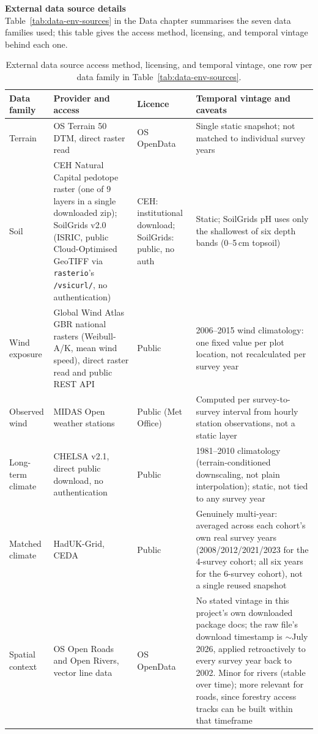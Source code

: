 \documentclass[logo,msc,ai]{infthesis}           %
\begin{document}
\begin{table}[H]
\centering
\textbf{External data source details}\label{app:data-sources}\\[4pt]
{\small Table~\ref{tab:data-env-sources} in the Data chapter summarises the seven data families used; this table gives the access method, licensing, and temporal vintage behind each one.\\[6pt]}
\scriptsize
\setlength{\tabcolsep}{3pt}
\renewcommand{\arraystretch}{1.1}
\begin{tabular}{p{1.8cm}p{4.7cm}p{2.0cm}p{5.2cm}}
\hline
Data family & Provider and access & Licence & Temporal vintage and caveats \\
\hline
Terrain & OS Terrain 50 DTM, direct raster read & OS OpenData & Single static snapshot; not matched to individual survey years \\
Soil & CEH Natural Capital pedotope raster (one of 9 layers in a single downloaded zip); SoilGrids v2.0 (ISRIC, public Cloud-Optimised GeoTIFF via \texttt{rasterio}'s \texttt{/vsicurl/}, no authentication) & CEH: institutional download; SoilGrids: public, no auth & Static; SoilGrids pH uses only the shallowest of six depth bands (0--5\,cm topsoil) \\
Wind exposure & Global Wind Atlas GBR national rasters (Weibull-A/K, mean wind speed), direct raster read and public REST API & Public & 2006--2015 wind climatology: one fixed value per plot location, not recalculated per survey year \\
Observed wind & MIDAS Open weather stations & Public (Met Office) & Computed per survey-to-survey interval from hourly station observations, not a static layer \\
Long-term climate & CHELSA v2.1, direct public download, no authentication & Public & 1981--2010 climatology (terrain-conditioned downscaling, not plain interpolation); static, not tied to any survey year \\
Matched climate & HadUK-Grid, CEDA & Public & Genuinely multi-year: averaged across each cohort's own real survey years (2008/2012/2021/2023 for the 4-survey cohort; all six years for the 6-survey cohort), not a single reused snapshot \\
Spatial context & OS Open Roads and Open Rivers, vector line data & OS OpenData & No stated vintage in this project's own downloaded package docs; the raw file's download timestamp is $\sim$July 2026, applied retroactively to every survey year back to 2002. Minor for rivers (stable over time); more relevant for roads, since forestry access tracks can be built within that timeframe \\
\hline
\end{tabular}
\caption{External data source access method, licensing, and temporal vintage, one row per
data family in Table~\ref{tab:data-env-sources}.}
\label{tab:data-sources-detail}
\end{table}
\end{document}
